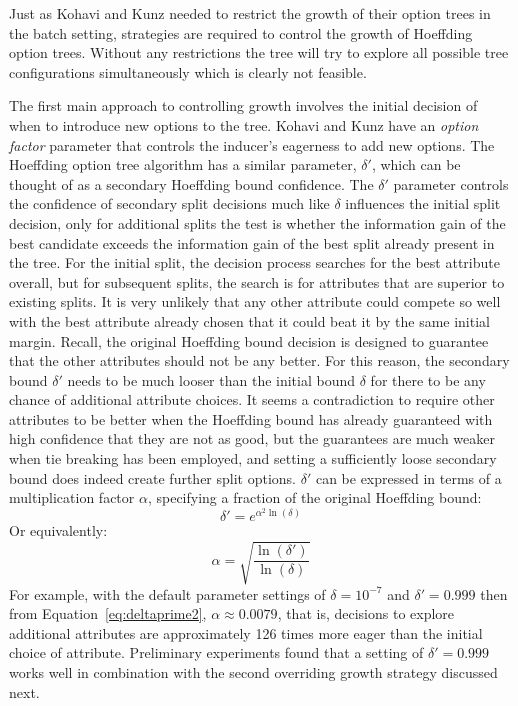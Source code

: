 Just as Kohavi and Kunz needed to restrict the growth of their option trees in the batch setting, strategies are required to control the growth of Hoeffding option trees. Without any restrictions the tree will try to explore all possible tree configurations simultaneously which is clearly not feasible.

The first main approach to controlling growth involves the initial decision of when to introduce new options to the tree. Kohavi and Kunz have an {\em option factor} parameter that controls the inducer's eagerness to add new options. The Hoeffding option tree algorithm has a similar parameter, $\delta'$, which can be thought of as a secondary Hoeffding bound confidence. The $\delta'$ parameter controls the confidence of secondary split decisions much like $\delta$ influences the initial split decision, only for additional splits 
the test is whether the information gain of the best candidate exceeds the information gain of the best split already present in the tree.
For the initial split, the decision process searches for the best attribute overall, but for subsequent splits, the search is for attributes that are superior to existing splits. It is very unlikely that any other attribute could compete so well with the best attribute already chosen that it could beat it by the same initial margin. Recall, the original Hoeffding bound decision is designed to guarantee that the other attributes should not be any better. For this reason, the secondary bound $\delta'$ needs to be much looser than the initial bound $\delta$ for there to be any chance of additional attribute choices.
It seems a contradiction to require other attributes to be better when the Hoeffding bound has already guaranteed with high confidence that they are not as good, but the guarantees are much weaker when tie breaking has been employed, and setting a sufficiently loose secondary bound does indeed create further split options.
$\delta'$ can be expressed in terms of a multiplication factor $\alpha$, specifying a fraction of the original Hoeffding bound:
\begin{equation}
\delta' = e^{\alpha ^ 2 \ln(\delta)}
\label{eq:deltaprime1}
\end{equation}
Or equivalently:
\begin{equation}
\alpha = \sqrt{\frac{\ln(\delta')}{\ln(\delta)}}
\label{eq:deltaprime2}
\end{equation}
For example, with the default parameter settings of $\delta=10^{-7}$ and $\delta'=0.999$ then from Equation~\ref{eq:deltaprime2}, $\alpha \approx 0.0079$, that is, decisions to explore additional attributes are approximately 126 times more eager than the initial choice of attribute. Preliminary experiments found that a setting of $\delta'=0.999$ works well in combination with the second overriding growth strategy discussed next.

